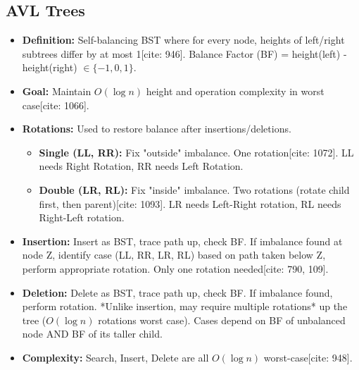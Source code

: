 \documentclass{article}
\begin{document}
\subsection{AVL Trees}
\begin{itemize}
    \item \textbf{Definition:} Self-balancing BST where for every node, heights of left/right subtrees differ by at most 1[cite: 946]. Balance Factor (BF) = height(left) - height(right) $\in \{-1, 0, 1\}$.
    \item \textbf{Goal:} Maintain $O(\log n)$ height and operation complexity in worst case[cite: 1066].
    \item \textbf{Rotations:} Used to restore balance after insertions/deletions.
          \begin{itemize}
              \item \textbf{Single (LL, RR):} Fix "outside" imbalance. One rotation[cite: 1072]. LL needs Right Rotation, RR needs Left Rotation.
              \item \textbf{Double (LR, RL):} Fix "inside" imbalance. Two rotations (rotate child first, then parent)[cite: 1093]. LR needs Left-Right rotation, RL needs Right-Left rotation.
          \end{itemize}
    \item \textbf{Insertion:} Insert as BST, trace path up, check BF. If imbalance found at node Z, identify case (LL, RR, LR, RL) based on path taken below Z, perform appropriate rotation. Only one rotation needed[cite: 790, 109].
    \item \textbf{Deletion:} Delete as BST, trace path up, check BF. If imbalance found, perform rotation. *Unlike insertion, may require multiple rotations* up the tree ($O(\log n)$ rotations worst case). Cases depend on BF of unbalanced node AND BF of its taller child.
    \item \textbf{Complexity:} Search, Insert, Delete are all $O(\log n)$ worst-case[cite: 948].
\end{itemize}
\end{document}
